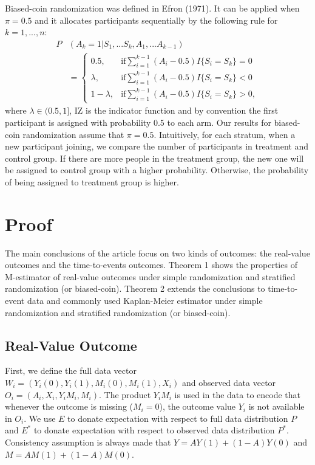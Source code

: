 \documentclass{article}
\begin{document}
Biased-coin randomization was defined in Efron (1971)\cite{efron1971forcing}. It can be applied when $\pi = 0.5$ and it allocates participants sequentially by the following rule for $k =1, . . . , n$:
\begin{align}
    P&(A_k=1|S_1,...S_k,A_1,...A_{k-1})\nonumber\\
    &=
    \begin{cases}
    0.5, &\mathrm{if} \sum_{i=1}^{k-1}(A_i-0.5)I\{S_i=S_k\}=0\\
    \lambda, &\mathrm{if} \sum_{i=1}^{k-1}(A_i-0.5)I\{S_i=S_k\}<0\\
     1-\lambda, &\mathrm{if} \sum_{i=1}^{k-1}(A_i-0.5)I\{S_i=S_k\}>0,
    \end{cases}\nonumber
\end{align}
where $\lambda \in (0.5,1]$, I{Z} is the indicator function and by convention the first participant is assigned with probability 0.5 to each arm. 
Our results for biased-coin randomization assume that $\pi =0.5$.
Intuitively, for each stratum, when a new participant joining, we compare the number of participants in treatment and control group. 
If there are more people in the treatment group, the new one will be assigned to control group with a  higher probability.
Otherwise, the probability of being assigned to treatment group is higher.

\section{Proof}
The main conclusions of the article focus on two kinds of outcomes: the real-value outcomes and the time-to-events outcomes. Theorem 1 shows the properties of  M-estimator of real-value outcomes under simple randomization and stratified randomization (or biased-coin). Theorem 2 extends the conclusions to time-to-event data and commonly used Kaplan-Meier estimator under  simple randomization and stratified randomization (or biased-coin).

\subsection{Real-Value Outcome}
First, we define the full data vector $W_i = (Y_i(0),Y_i(1),M_i(0),M_i(1),X_i)$ and observed data vector $O_i=(A_i,X_i,Y_i M_i,M_i)$. The product $Y_i M_i$ is used in the data to encode that whenever the outcome
is missing ($M_i = 0$), the outcome value $Y_i$ is not available
in $O_i$. We use $E$ to donate expectation with respect to full data distribution $P$ and $E^*$ to donate expectation with respect to observed data distribution $P^*$. Consistency assumption is always made that $Y = A Y(1)+(1-A)Y(0)$ and $M = A M(1)+(1-A)M(0)$.
\end{document}
